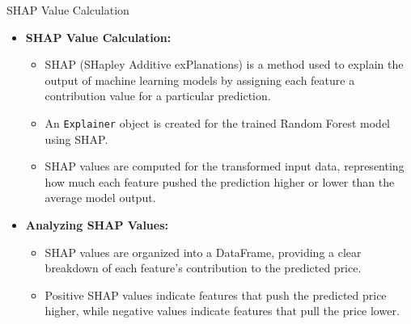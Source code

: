 \documentclass{beamer}
\begin{document}
\begin{frame}{SHAP Value Calculation}
    \begin{itemize}
        \item \textbf{SHAP Value Calculation:}
        \begin{itemize}
            \item SHAP (SHapley Additive exPlanations) is a method used to explain the output of machine learning models by assigning each feature a contribution value for a particular prediction.
            \item An \texttt{Explainer} object is created for the trained Random Forest model using SHAP.
            \item SHAP values are computed for the transformed input data, representing how much each feature pushed the prediction higher or lower than the average model output.
        \end{itemize}
        \vspace{5pt}
        
        \item \textbf{Analyzing SHAP Values:}
        \begin{itemize}
            \item SHAP values are organized into a DataFrame, providing a clear breakdown of each feature’s contribution to the predicted price.
            \item Positive SHAP values indicate features that push the predicted price higher, while negative values indicate features that pull the price lower.
        \end{itemize}
    \end{itemize}
\end{frame}
\end{document}

